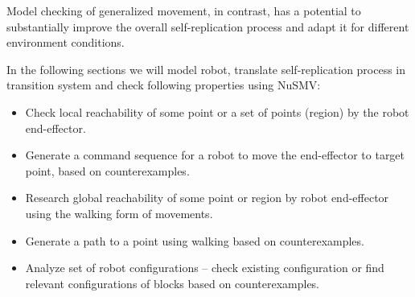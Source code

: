 Model checking of generalized movement, in contrast, has a potential to substantially 
improve the overall self-replication process and adapt it for different 
environment conditions.

In the following sections we will model robot, translate self-replication process 
in transition system and check following properties using NuSMV:
\begin{itemize}
    \item  Check local reachability of some point or a set of points (region) 
        by the robot end-effector. 
    \item Generate a command sequence for a robot to move the end-effector to
        target point, based on counterexamples.
    \item  Research global reachability of some point or region by robot end-effector 
        using the walking form of movements.
    \item Generate a path to a point using walking based on counterexamples.
    \item Analyze set of robot configurations -- check existing configuration or find 
        relevant  configurations of blocks based on counterexamples. 
\end{itemize}

%
%
%
%
%
%
%
%
%




%
